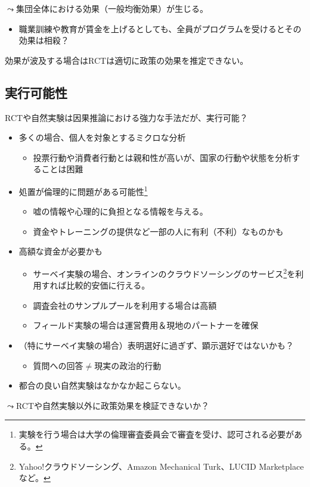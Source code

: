 \documentclass[
  xelatex,
  ja=standard]{bxjsarticle}
\providecommand{\tightlist}{%
  \setlength{\itemsep}{0pt}\setlength{\parskip}{0pt}}\usepackage{longtable,booktabs,array}
\begin{document}
\(\leadsto\)集団全体における効果（一般均衡効果）が生じる。

\begin{itemize}
\tightlist
\item
  職業訓練や教育が賃金を上げるとしても、全員がプログラムを受けるとその効果は相殺？
\end{itemize}

効果が波及する場合はRCTは適切に政策の効果を推定できない。

\hypertarget{ux5b9fux884cux53efux80fdux6027}{%
\subsection{実行可能性}\label{ux5b9fux884cux53efux80fdux6027}}

RCTや自然実験は因果推論における強力な手法だが、実行可能？

\begin{itemize}
\tightlist
\item
  多くの場合、個人を対象とするミクロな分析

  \begin{itemize}
  \tightlist
  \item
    投票行動や消費者行動とは親和性が高いが、国家の行動や状態を分析することは困難
  \end{itemize}
\item
  処置が倫理的に問題がある可能性\footnote{実験を行う場合は大学の倫理審査委員会で審査を受け、認可される必要がある。}

  \begin{itemize}
  \tightlist
  \item
    嘘の情報や心理的に負担となる情報を与える。
  \item
    資金やトレーニングの提供など一部の人に有利（不利）なものかも
  \end{itemize}
\item
  高額な資金が必要かも

  \begin{itemize}
  \tightlist
  \item
    サーベイ実験の場合、オンラインのクラウドソーシングのサービス\footnote{Yahoo!クラウドソーシング、Amazon
      Mechanical Turk、LUCID Marketplaceなど。}を利用すれば比較的安価に行える。
  \item
    調査会社のサンプルプールを利用する場合は高額
  \item
    フィールド実験の場合は運営費用＆現地のパートナーを確保
  \end{itemize}
\item
  （特にサーベイ実験の場合）表明選好に過ぎず、顕示選好ではないかも？

  \begin{itemize}
  \tightlist
  \item
    質問への回答\(\neq\)現実の政治的行動
  \end{itemize}
\item
  都合の良い自然実験はなかなか起こらない。
\end{itemize}

\(\leadsto\)RCTや自然実験以外に政策効果を検証できないか？


  
\end{document}
